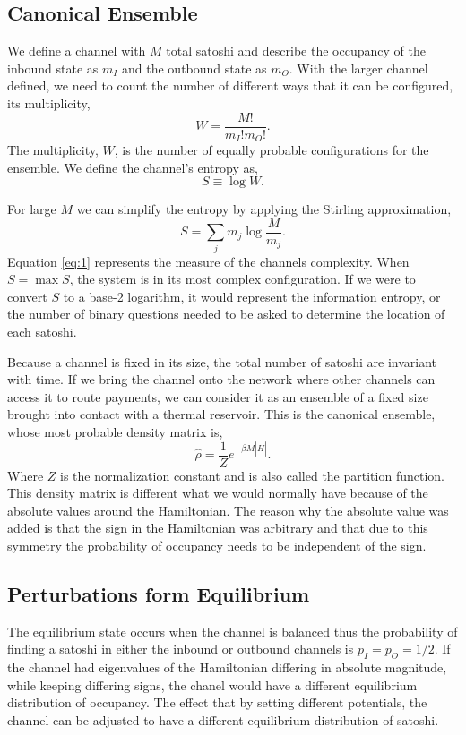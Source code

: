 \documentclass[review,12pt]{elsarticle}
\begin{document}
\subsection{Canonical Ensemble}
We define a channel with $M$ total satoshi and describe the occupancy of the inbound state as $m_I$ and the outbound state as $m_O$.
With the larger channel defined, we need to count the number of different ways that it can be configured, its multiplicity,
\begin{equation}
  W = \frac{M!}{m_I!m_O!}. \nonumber
\end{equation}
The multiplicity, $W$, is the number of equally probable configurations for the ensemble.
We define the channel's entropy as,
\begin{equation}
  S \equiv \log W. \nonumber
\end{equation}

For large $M$ we can simplify the entropy by applying the Stirling approximation,
\begin{equation}
  S = \sum_j m_j \log\frac{M}{m_j}.\label{eq:1}
\end{equation}
Equation \ref{eq:1} represents the measure of the channels complexity.
When $S = \max S$, the system is in its most complex configuration.
If we were to convert $S$ to a base-2 logarithm, it would represent the information entropy, or the number of binary questions needed to be asked to determine the location of each satoshi.

Because a channel is fixed in its size, the total number of satoshi are invariant with time.
If we bring the channel onto the network where other channels can access it to route payments, we can consider it as an ensemble of a fixed size brought into contact with a thermal reservoir.
This is the canonical ensemble, whose most probable density matrix is,
\begin{equation}
  \hat{\rho} = \frac{1}{Z}e^{-\beta M \left\lvert \hat{H} \right\rvert}. \nonumber
\end{equation}
Where $Z$ is the normalization constant and is also called the partition function.
This density matrix is different what we would normally have because of the absolute values around the Hamiltonian.
The reason why the absolute value was added is that the sign in the Hamiltonian was arbitrary and that due to this symmetry the probability of occupancy needs to be independent of the sign.

\subsection{Perturbations form Equilibrium}
The equilibrium state occurs when the channel is balanced thus the probability of finding a satoshi in either the inbound or outbound channels is $p_I=p_O=1/2$.
If the channel had eigenvalues of the Hamiltonian differing in absolute magnitude, while keeping differing signs, the chanel would have a different equilibrium distribution of occupancy.
The effect that by setting different potentials, the channel can be adjusted to have a different equilibrium distribution of satoshi.
\end{document}
